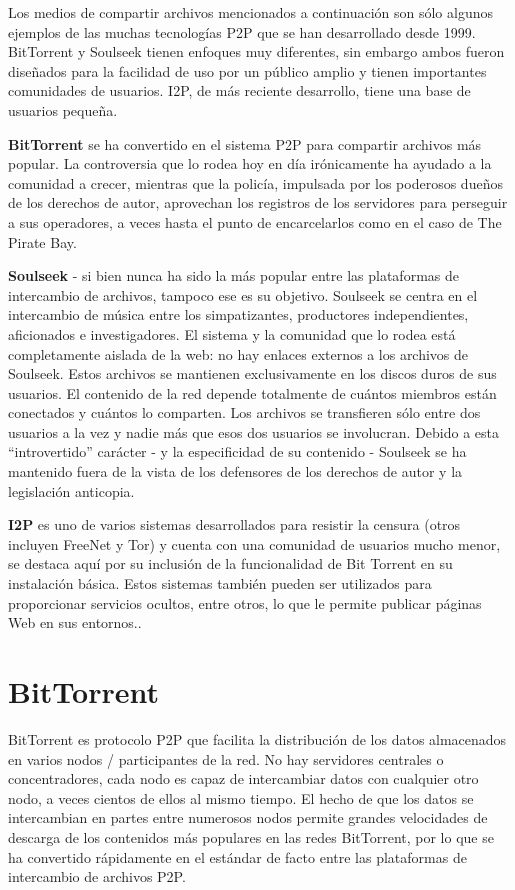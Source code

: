\documentclass[10pt,a5paper,twoside,,]{book}
\begin{document}
Los medios de compartir archivos mencionados a continuación son sólo
algunos ejemplos de las muchas tecnologías P2P que se han desarrollado
desde 1999. BitTorrent y Soulseek tienen enfoques muy diferentes, sin
embargo ambos fueron diseñados para la facilidad de uso por un público
amplio y tienen importantes comunidades de usuarios. I2P, de más
reciente desarrollo, tiene una base de usuarios pequeña.

\textbf{BitTorrent} se ha convertido en el sistema P2P para compartir
archivos más popular. La controversia que lo rodea hoy en día
irónicamente ha ayudado a la comunidad a crecer, mientras que la
policía, impulsada por los poderosos dueños de los derechos de autor,
aprovechan los registros de los servidores para perseguir a sus
operadores, a veces hasta el punto de encarcelarlos como en el caso de
The Pirate Bay.

\textbf{Soulseek} - si bien nunca ha sido la más popular entre las
plataformas de intercambio de archivos, tampoco ese es su objetivo.
Soulseek se centra en el intercambio de música entre los simpatizantes,
productores independientes, aficionados e investigadores. El sistema y
la comunidad que lo rodea está completamente aislada de la web: no hay
enlaces externos a los archivos de Soulseek. Estos archivos se mantienen
exclusivamente en los discos duros de sus usuarios. El contenido de la
red depende totalmente de cuántos miembros están conectados y cuántos lo
comparten. Los archivos se transfieren sólo entre dos usuarios a la vez
y nadie más que esos dos usuarios se involucran. Debido a esta
``introvertido'' carácter - y la especificidad de su contenido -
Soulseek se ha mantenido fuera de la vista de los defensores de los
derechos de autor y la legislación anticopia.

\textbf{I2P} es uno de varios sistemas desarrollados para resistir la
censura (otros incluyen FreeNet y Tor) y cuenta con una comunidad de
usuarios mucho menor, se destaca aquí por su inclusión de la
funcionalidad de Bit Torrent en su instalación básica. Estos sistemas
también pueden ser utilizados para proporcionar servicios ocultos, entre
otros, lo que le permite publicar páginas Web en sus entornos..

\section{BitTorrent}\label{bittorrent}

BitTorrent es protocolo P2P que facilita la distribución de los datos
almacenados en varios nodos / participantes de la red. No hay servidores
centrales o concentradores, cada nodo es capaz de intercambiar datos con
cualquier otro nodo, a veces cientos de ellos al mismo tiempo. El hecho
de que los datos se intercambian en partes entre numerosos nodos permite
grandes velocidades de descarga de los contenidos más populares en las
redes BitTorrent, por lo que se ha convertido rápidamente en el estándar
de facto entre las plataformas de intercambio de archivos P2P.
\end{document}
